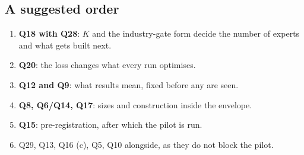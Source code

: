 \subsection{A suggested order}

\begin{enumerate}
\item \textbf{Q18 with Q28}: $K$ and the industry-gate form decide the number of experts and what gets
  built next.
\item \textbf{Q20}: the loss changes what every run optimises.
\item \textbf{Q12 and Q9}: what results mean, fixed before any are seen.
\item \textbf{Q8, Q6/Q14, Q17}: sizes and construction inside the envelope.
\item \textbf{Q15}: pre-registration, after which the pilot is run.
\item Q29, Q13, Q16 (c), Q5, Q10 alongside, as they do not block the pilot.
\end{enumerate}
